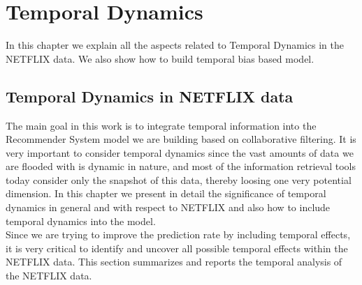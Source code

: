 \chapter{Temporal Dynamics}



\textsf{ In this chapter we explain all the aspects related to Temporal Dynamics
in the NETFLIX data. We also show how to build temporal bias based model.}

\section{Temporal Dynamics in NETFLIX data}
The main goal in this work is to integrate temporal information into the
Recommender System model we are building based on collaborative filtering. It is
very important to consider temporal dynamics since the vast amounts of data we
are flooded with is dynamic in nature, and most of the information retrieval
tools today consider only the snapshot of this data, thereby loosing one very
potential dimension. In this chapter we present in detail the significance of
temporal dynamics in general and with respect to NETFLIX and also how to include
temporal dynamics into the model. \\


Since we are trying to improve the prediction rate by including temporal
effects, it is very critical to identify and uncover all possible temporal
effects within the NETFLIX data. This section summarizes and reports the
temporal analysis of the NETFLIX data.

